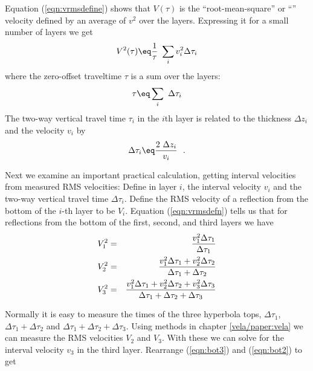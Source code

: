 \par
Equation (\ref{eqn:vrmsdefine}) shows that
$V(\tau)$
is
the ``root-mean-square'' or
``\RMS'' velocity defined by
an average of $v^2$ over the layers.
Expressing it for a small number of layers we get
\begin{equation}
V^2(\tau) \eq \frac{1}{\tau}\  \sum_i v^2_i \Delta\tau_i
\label{eqn:vrmsdefn}
\end{equation}
where the zero-offset traveltime $\tau$ is a sum over the layers:
\begin{equation}
\tau \eq \sum_i \ \Delta\tau_i
\label{eqn:onetaudefn}
\end{equation}
The two-way vertical travel time $\tau_i$
in the $i$th layer is related to the
thickness $\Delta z_i$ and the velocity $v_i$  by
\begin{equation}
\Delta\tau_i \eq  \frac{2\ \Delta z_i}{v_i}  \ \ .
\label{eqn:twotaudefn}
\end{equation}
\par
Next we examine an important practical calculation,
getting interval velocities from measured RMS velocities:
Define
in layer $i$,
the interval velocity $v_i$
and the two-way vertical travel time $\Delta\tau_i$.
Define the RMS velocity
of a reflection
from the bottom of the $i$-th layer
to be $V_i$.
Equation (\ref{eqn:vrmsdefn}) tells us that for
reflections from the bottom of the first, second, and third layers we have
\begin{eqnarray}
V_1^2 &=& {v_1^2\Delta\tau_1           
                               \over \Delta\tau_1                 }
\\
\label{eqn:bot2}
V_2^2 &=& {v_1^2\Delta\tau_1+ v_2^2\Delta\tau_2 
                               \over \Delta\tau_1 + \Delta\tau_2        }
\\
\label{eqn:bot3}
V_3^2 &=& {v_1^2\Delta\tau_1+ v_2^2\Delta\tau_2 +v_3^2\Delta\tau_3  
                               \over \Delta\tau_1 + \Delta\tau_2 +\Delta\tau_3}
\end{eqnarray}

Normally it is easy to measure the times of the three hyperbola tops,
$\Delta\tau_1$, 
$\Delta\tau_1 + \Delta\tau_2$
and
$\Delta\tau_1 + \Delta\tau_2 +\Delta\tau_3$.
Using methods in chapter \ref{vela/paper:vela}
we can measure the RMS velocities $V_2$ and $V_3$.
With these we can solve for the interval velocity $v_3$ in the third layer.
Rearrange (\ref{eqn:bot3}) and (\ref{eqn:bot2}) to get

